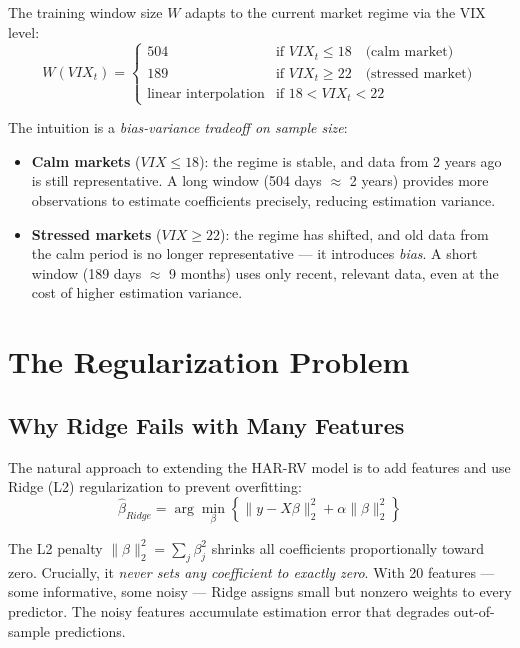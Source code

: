 \documentclass[11pt,a4paper]{article}
\begin{document}
The training window size $W$ adapts to the current market regime via the VIX level:
\begin{equation}
    W(VIX_t) = \begin{cases}
        504 & \text{if } VIX_t \leq 18 \quad \text{(calm market)}\\
        189 & \text{if } VIX_t \geq 22 \quad \text{(stressed market)}\\
        \text{linear interpolation} & \text{if } 18 < VIX_t < 22
    \end{cases}
\end{equation}

The intuition is a \textit{bias-variance tradeoff on sample size}:
\begin{itemize}
    \item \textbf{Calm markets} ($VIX \leq 18$): the regime is stable, and data from 2 years ago is still representative. A long window (504 days $\approx$ 2 years) provides more observations to estimate coefficients precisely, reducing estimation variance.
    \item \textbf{Stressed markets} ($VIX \geq 22$): the regime has shifted, and old data from the calm period is no longer representative --- it introduces \textit{bias}. A short window (189 days $\approx$ 9 months) uses only recent, relevant data, even at the cost of higher estimation variance.
\end{itemize}

\section{The Regularization Problem}
\label{sec:regularization}

\subsection{Why Ridge Fails with Many Features}

The natural approach to extending the HAR-RV model is to add features and use Ridge (L2) regularization to prevent overfitting:
\begin{equation}
    \hat{\beta}_{Ridge} = \arg\min_\beta \left\{ \|y - X\beta\|_2^2 + \alpha \|\beta\|_2^2 \right\}
\end{equation}

The L2 penalty $\|\beta\|_2^2 = \sum_j \beta_j^2$ shrinks all coefficients proportionally toward zero. Crucially, it \textit{never sets any coefficient to exactly zero}. With 20 features --- some informative, some noisy --- Ridge assigns small but nonzero weights to every predictor. The noisy features accumulate estimation error that degrades out-of-sample predictions.
\end{document}
